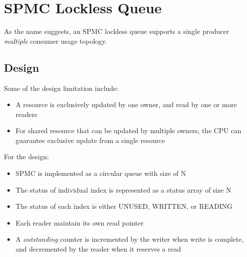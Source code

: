 % 

\chapter{SPMC Lockless Queue}

As the name suggests, an SPMC lockless queue supports a single producer
\textit{multiple} consumer usage topology.\newline

\begin{center}
\end{center}

\section{Design}

Some of the design limitation include:
\begin{itemize}
    \item A resource is exclusively updated by one owner, and read by one or more readers
    \item For shared resource that can be updated by multiple owners, the CPU
    can guarantee exclusive update from a single resource 
\end{itemize}

For the design:
\begin{itemize}
    \item SPMC is implemented as a circular queue with size of N
    \item The status of individual index is represented as a status array of size N
    \item The status of each index is either UNUSED, WRITTEN, or READING
    \item Each reader maintain its own read pointer
    \item A \textit{outstanding} counter is incremented by the writer when write is complete, 
    and decremented by the reader when it reserves a read
\end{itemize}

